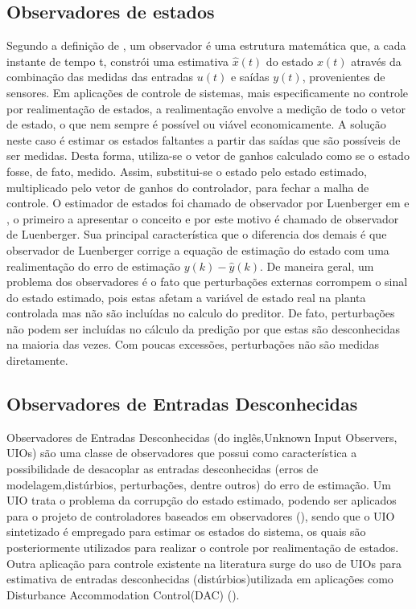 \subsection{Observadores de estados}
Segundo a definição de \cite{EllisObserver}, um observador é uma estrutura matemática que, a cada instante de tempo t, constrói uma estimativa $\hat{x}(t)$ do estado $x(t)$ através da combinação das medidas das entradas $u(t)$ e saídas $y(t)$, provenientes de sensores. Em aplicações de controle de sistemas, mais especificamente no controle por realimentação de estados, a realimentação envolve a medição de todo o vetor de estado, o que nem sempre é possível ou viável economicamente. A solução neste caso é estimar os estados faltantes a partir das saídas que são possíveis de ser medidas. Desta forma, utiliza-se o vetor de ganhos calculado como se o estado fosse, de fato, medido. Assim, substitui-se o estado pelo estado estimado, multiplicado pelo vetor de ganhos do controlador, para fechar a malha de controle.
O estimador de estados foi chamado de observador por Luenberger em \cite{Luenberger1971AnObservers} e \cite{Luenberger}, o primeiro a apresentar o conceito e por este motivo é chamado de observador de Luenberger. Sua principal característica que o diferencia dos demais é que observador de Luenberger corrige a equação de estimação do estado com uma realimentação do erro de estimação $y(k)-\hat{y}(k)$.
De maneira geral, um problema dos observadores é o fato que perturbações externas corrompem o sinal do estado estimado, pois estas afetam a variável de estado real na planta controlada mas não são incluídas no calculo do preditor. De fato, perturbações não podem ser incluídas no cálculo da predição por que estas são desconhecidas na maioria das vezes. Com poucas excessões, perturbações não são medidas diretamente.  
\subsection{Observadores de Entradas Desconhecidas}
Observadores de Entradas Desconhecidas (do inglês,Unknown Input Observers, UIOs) são uma classe de observadores que possui como característica a possibilidade de desacoplar as entradas desconhecidas (erros de modelagem,distúrbios, perturbações, dentre outros) do erro de estimação. Um UIO trata o problema da corrupção do estado estimado, podendo ser aplicados para o projeto de controladores baseados em observadores (\cite{Zasadzinski1995LoopTR}), sendo que o UIO sintetizado é empregado para estimar os estados do sistema, os quais são posteriormente utilizados para realizar o controle por realimentação de estados. Outra aplicação para controle existente na literatura surge do uso de UIOs para estimativa de entradas desconhecidas (distúrbios)utilizada em aplicações como Disturbance Accommodation Control(DAC) (\cite{Chen2016Disturbance-Observer-BasedOverview}).